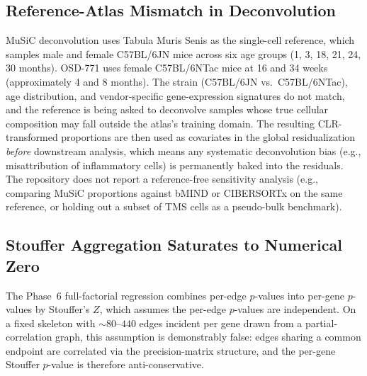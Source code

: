 \documentclass[11pt]{article}
\begin{document}
\subsection{Reference-Atlas Mismatch in Deconvolution}
MuSiC deconvolution uses Tabula Muris Senis as the single-cell reference, which samples male and female C57BL/6JN mice across six age groups (1, 3, 18, 21, 24, 30 months). OSD-771 uses female C57BL/6NTac mice at 16 and 34 weeks (approximately 4 and 8 months). The strain (C57BL/6JN vs.\ C57BL/6NTac), age distribution, and vendor-specific gene-expression signatures do not match, and the reference is being asked to deconvolve samples whose true cellular composition may fall outside the atlas's training domain. The resulting CLR-transformed proportions are then used as covariates in the global residualization \emph{before} downstream analysis, which means any systematic deconvolution bias (e.g., misattribution of inflammatory cells) is permanently baked into the residuals. The repository does not report a reference-free sensitivity analysis (e.g., comparing MuSiC proportions against bMIND or CIBERSORTx on the same reference, or holding out a subset of TMS cells as a pseudo-bulk benchmark).

\subsection{Stouffer Aggregation Saturates to Numerical Zero}
The Phase~6 full-factorial regression combines per-edge $p$-values into per-gene $p$-values by Stouffer's $Z$, which assumes the per-edge $p$-values are independent. On a fixed skeleton with $\sim 80$--$440$ edges incident per gene drawn from a partial-correlation graph, this assumption is demonstrably false: edges sharing a common endpoint are correlated via the precision-matrix structure, and the per-gene Stouffer $p$-value is therefore anti-conservative.
\end{document}
